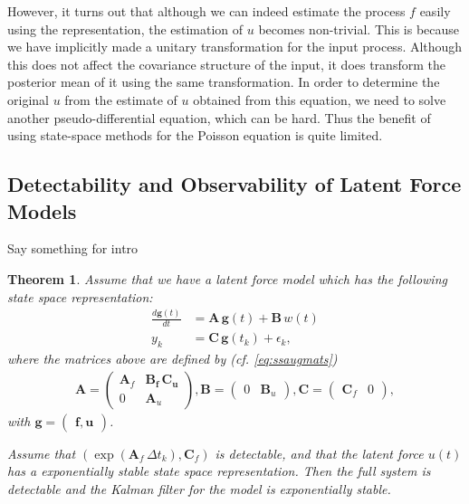 \documentclass[journal]{IEEEtran}
\newtheorem{theorem}{Theorem}[section]
\newcommand{\simo}[1]{{\color{red}#1}}
\begin{document}
However, it turns out that although we can indeed estimate the process $f$ easily using the representation, the estimation of $u$ becomes non-trivial. This is because we have implicitly made a unitary transformation for the input process. Although this does not affect the covariance structure of the input, it does transform the posterior mean of it using the same transformation. In order to determine the original $u$ from the estimate of $u$ obtained from this equation, we need to solve another pseudo-differential equation, which can be hard. Thus the benefit of using state-space methods for the Poisson equation is quite limited. 

\subsection{Detectability and Observability of Latent Force Models}

\simo{Say something for intro}

\begin{theorem}
  Assume that we have a latent force model which has the following state space representation:
\begin{equation}
\begin{split}
  \frac{d\mathbf{g}(t)}{dt}
  &= \mathbf{A} \, \mathbf{g}(t)
  + \mathbf{B} \, w(t) \\
  y_k &= \mathbf{C} \, \mathbf{g}(t_k) + \epsilon_k,
\end{split}
\end{equation}
%
where the matrices above are defined by (cf. \eqref{eq:ssaugmats})
%
\begin{equation}
\begin{split}
  \mathbf{A}
  = \begin{pmatrix}
	\mathbf{A}_f & \mathbf{\mathbf{B}_f \, \mathbf{C}_u} \\
	0 & \mathbf{A}_u
  \end{pmatrix}, 
  \mathbf{B}
  = \begin{pmatrix}
	0 & \mathbf{B}_u
  \end{pmatrix}, 
  \mathbf{C}
  = \begin{pmatrix}
	\mathbf{C}_f & 0
  \end{pmatrix},
\end{split}
\end{equation}
%
with $\mathbf{g} = \begin{pmatrix} \mathbf{f}, \mathbf{u} \end{pmatrix}$. 

Assume that $(\exp(\mathbf{A}_f \, \Delta t_k),\mathbf{C}_f)$ is detectable, and that the latent force $u(t)$ has a exponentially stable state space representation. Then the full system is \emph{detectable} and the Kalman filter for the model is exponentially stable.
\end{theorem}
\end{document}
